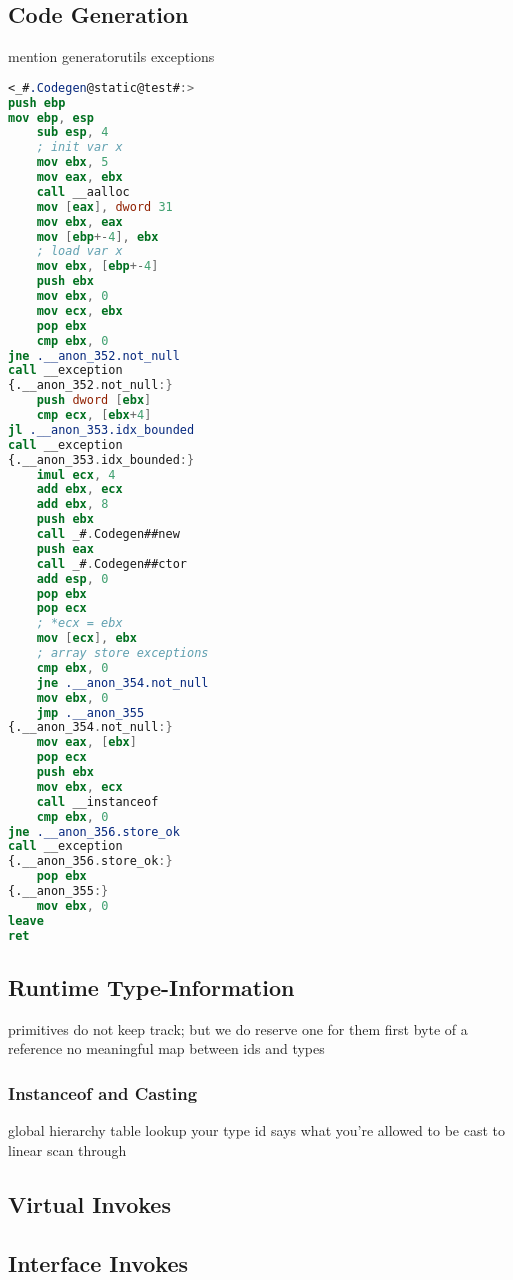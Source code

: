 \documentclass{article}
\begin{document}
\subsection{Code Generation}
mention generatorutils
exceptions

\begin{lstlisting}[language=nasm]
<_#.Codegen@static@test#:>
push ebp
mov ebp, esp
    sub esp, 4
    ; init var x
    mov ebx, 5
    mov eax, ebx
    call __aalloc
    mov [eax], dword 31
    mov ebx, eax
    mov [ebp+-4], ebx
    ; load var x
    mov ebx, [ebp+-4]
    push ebx
    mov ebx, 0
    mov ecx, ebx
    pop ebx
    cmp ebx, 0
jne .__anon_352.not_null
call __exception
{.__anon_352.not_null:}
    push dword [ebx]
    cmp ecx, [ebx+4]
jl .__anon_353.idx_bounded
call __exception
{.__anon_353.idx_bounded:}
    imul ecx, 4
    add ebx, ecx
    add ebx, 8
    push ebx
    call _#.Codegen##new
    push eax
    call _#.Codegen##ctor
    add esp, 0
    pop ebx
    pop ecx
    ; *ecx = ebx
    mov [ecx], ebx
    ; array store exceptions
    cmp ebx, 0
    jne .__anon_354.not_null
    mov ebx, 0
    jmp .__anon_355
{.__anon_354.not_null:}
    mov eax, [ebx]
    pop ecx
    push ebx
    mov ebx, ecx
    call __instanceof
    cmp ebx, 0
jne .__anon_356.store_ok
call __exception
{.__anon_356.store_ok:}
    pop ebx
{.__anon_355:}
    mov ebx, 0
leave
ret
\end{lstlisting}

\subsection{Runtime Type-Information}
primitives do not keep track; but we do reserve one for them
first byte of a reference
no meaningful map between ids and types


\subsubsection{Instanceof and Casting}
global hierarchy table
lookup your type id
says what you're allowed to be cast to
linear scan through


\subsection{Virtual Invokes}

\subsection{Interface Invokes}
\end{document}
